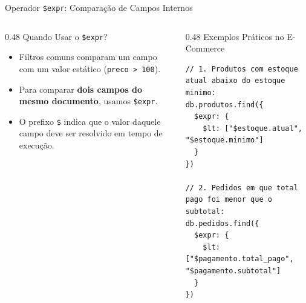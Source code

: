 \begin{frame}[fragile]{Operador \texttt{\$expr}: Comparação de Campos Internos}
  \vspace{0.05cm}
  \begin{columns}[t]
    \begin{column}{0.48\textwidth}
      \alert{Quando Usar o \texttt{\$expr}?}\par
      \scriptsize
      \begin{itemize}
        \item Filtros comuns comparam um campo com um valor estático (\texttt{preco > 100}).
        \item Para comparar \textbf{dois campos do mesmo documento}, usamos \texttt{\$expr}.
        \item O prefixo \texttt{\$} indica que o valor daquele campo deve ser resolvido em tempo de execução.
      \end{itemize}
    \end{column}
    \begin{column}{0.48\textwidth}
      \alert{Exemplos Práticos no E-Commerce}\par
      \begin{lstlisting}[language=mongosh]
// 1. Produtos com estoque atual abaixo do estoque minimo:
db.produtos.find({
  $expr: {
    $lt: ["$estoque.atual", "$estoque.minimo"]
  }
})

// 2. Pedidos em que total pago foi menor que o subtotal:
db.pedidos.find({
  $expr: {
    $lt: ["$pagamento.total_pago", "$pagamento.subtotal"]
  }
})
      \end{lstlisting}
    \end{column}
  \end{columns}
\end{frame}

